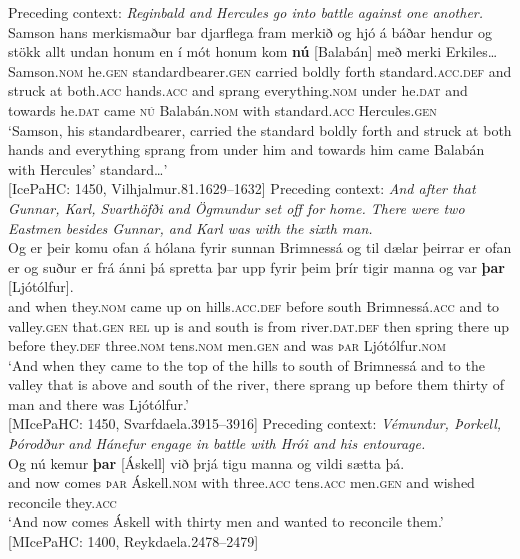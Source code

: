 \documentclass[output=paper,colorlinks,citecolor=brown]{langscibook}
\begin{document}
\ea \label{name-pres-foc}
\ea
    Preceding context: \textit{Reginbald and Hercules go into battle against one another.}\\
    \gll Samson hans merkismaður bar djarflega fram merkið og hjó á báðar hendur og stökk allt undan honum en {í mót} honum kom \textbf{nú} [Balabán] með merki Erkiles\dots \\ 
    Samson.\textsc{nom} he.\textsc{gen} standardbearer.\textsc{gen} carried boldly forth standard.\textsc{acc.def} and struck at both.\textsc{acc} hands.\textsc{acc} and sprang everything.\textsc{nom} under he.\textsc{dat} and towards he.\textsc{dat} came \textsc{nú} Balabán.\textsc{nom} with standard.\textsc{acc} Hercules.\textsc{gen}\\
    \glt `Samson, his standardbearer, carried the standard boldly forth and struck at both hands and everything sprang from under him and towards him came Balabán with Hercules' standard\dots' \\ \hfill [IcePaHC: 1450, Vilhjalmur.81.1629--1632]
\ex 
    Preceding context: \textit{And after that Gunnar, Karl, Svarthöfði and Ögmundur set off for home. There were two Eastmen besides Gunnar, and Karl was with the sixth man.}\\
   \gll  Og er þeir komu ofan á hólana fyrir sunnan Brimnessá og til dælar þeirrar er ofan er og suður er frá ánni þá spretta þar upp fyrir þeim þrír tigir manna og var \textbf{þar} [Ljótólfur].\\
    and when they.\textsc{nom} came up on hills.\textsc{acc.def} before south Brimnessá.\textsc{acc} and to valley.\textsc{gen} that.\textsc{gen} \textsc{rel} up is and south is from river.\textsc{dat.def} then spring there up before they.\textsc{def} three.\textsc{nom} tens.\textsc{nom} men.\textsc{gen} and was \textsc{þar} Ljótólfur.\textsc{nom}\\
    \glt `And when they came to the top of the hills to south of Brimnessá and to the valley that is above and south of the river, there sprang up before them thirty of man and there was Ljótólfur.'\\ \hfill [MIcePaHC: 1450, Svarfdaela.3915--3916]
\ex 
    Preceding context: \textit{Vémundur, Þorkell, Þórodður and  Hánefur engage in battle with Hrói and his entourage.}\\
    \gll Og nú kemur \textbf{þar} [Áskell] við þrjá tigu manna og vildi sætta þá.\\
    and now comes \textsc{þar} Áskell.\textsc{nom} with three.\textsc{acc} tens.\textsc{acc} men.\textsc{gen} and wished reconcile they.\textsc{acc}\\
   \glt  `And now comes Áskell with thirty men and wanted to reconcile them.' \hfill [MIcePaHC: 1400, Reykdaela.2478--2479]
\z 
\z 
\end{document}
